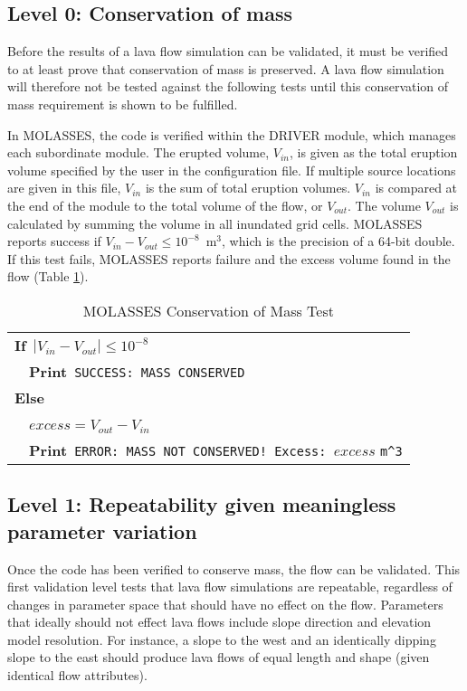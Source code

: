	\subsection{Level 0: Conservation of mass}
			Before the results of a lava flow simulation can be validated, it must be verified to at least prove that conservation of mass is preserved. A lava flow simulation will therefore not be tested against the following tests until this conservation of mass requirement is shown to be fulfilled.
			
			In MOLASSES, the code is verified within the DRIVER module, which manages each subordinate module. The erupted volume, $V_{in}$, is given as the total eruption volume specified by the user in the configuration file. If multiple source locations are given in this file, $V_{in}$ is the sum of total eruption volumes. $V_{in}$ is compared at the end of the module to the total volume of the flow, or $V_{out}$. The volume $V_{out}$ is calculated by summing the volume in all inundated grid cells. MOLASSES reports success if $V_{in}-V_{out} \le 10^{-8}$~m$^3$, which is the precision of a 64-bit double. If this test fails, MOLASSES reports failure and the excess volume found in the flow (Table \ref{tab_masscons}).
	
			\begin{table}[h]
				\centering
				\caption{MOLASSES Conservation of Mass Test}
				\begin{tabular}{l}
					\toprule
					\textbf{If}~$|V_{in}-V_{out}| \le 10^{-8}$\\
					~~\textbf{Print}~\verb|SUCCESS: MASS CONSERVED|\\
					\textbf{Else}\\
					~~$excess = V_{out}-V_{in}$\\
					~~\textbf{Print}~\verb|ERROR: MASS NOT CONSERVED! Excess: |$excess$ \verb|m^3|\\
					\bottomrule
				\end{tabular}
				\label{tab_masscons}
			\end{table}

	\subsection{Level 1: Repeatability given meaningless parameter variation}
		Once the code has been verified to conserve mass, the flow can be validated. This first validation level tests that lava flow simulations are repeatable, regardless of changes in parameter space that should have no effect on the flow. Parameters that ideally should not effect lava flows include slope direction and elevation model resolution. For instance, a slope to the west and an identically dipping slope to the east should produce lava flows of equal length and shape (given identical flow attributes).
		
